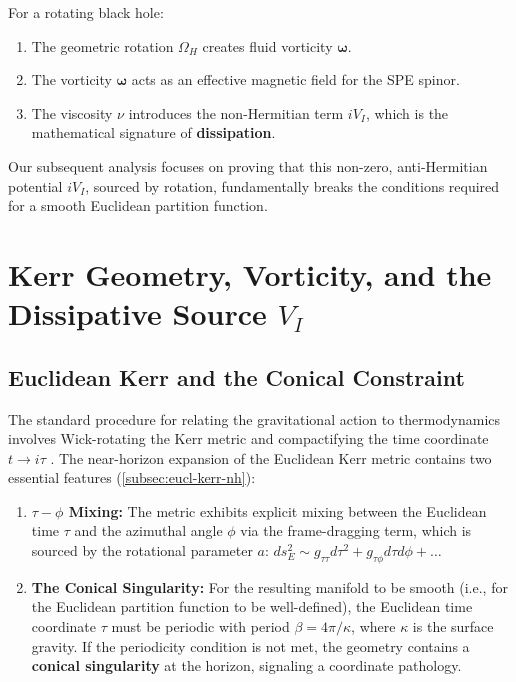 \documentclass[11pt]{article}
\begin{document}
For a rotating black hole:
\begin{enumerate}
    \item The geometric rotation $\Omega_H$ creates fluid vorticity $\mathbf{\omega}$.
    \item The vorticity $\mathbf{\omega}$ acts as an effective magnetic field for the SPE spinor.
    \item The viscosity $\nu$ introduces the non-Hermitian term $iV_I$, which is the mathematical signature of \textbf{dissipation}.
\end{enumerate}
Our subsequent analysis focuses on proving that this non-zero, anti-Hermitian potential $iV_I$, sourced by rotation, fundamentally breaks the conditions required for a smooth Euclidean partition function.

\section{Kerr Geometry, Vorticity, and the Dissipative Source $V_I$}

\subsection{Euclidean Kerr and the Conical Constraint}

The standard procedure for relating the gravitational action to thermodynamics involves Wick-rotating the Kerr metric\cite{Kerr1963} and compactifying the time coordinate $t \to i\tau$ \cite{GibbonsHawking1977}. The near-horizon expansion of the Euclidean Kerr metric\cite{Kerr1963} contains two essential features (\autoref{subsec:eucl-kerr-nh}):

\begin{enumerate}
    \item \textbf{$\tau-\phi$ Mixing:} The metric exhibits explicit mixing between the Euclidean time $\tau$ and the azimuthal angle $\phi$ via the frame-dragging term, which is sourced by the rotational parameter $a$: $ds^2_E \sim g_{\tau\tau} d\tau^2 + g_{\tau\phi} d\tau d\phi + \dots$
    \item \textbf{The Conical Singularity:} For the resulting manifold to be smooth (i.e., for the Euclidean partition function to be well-defined), the Euclidean time coordinate $\tau$ must be periodic with period $\beta = 4\pi/\kappa$, where $\kappa$ is the surface gravity. If the periodicity condition is not met, the geometry contains a \textbf{conical singularity} at the horizon, signaling a coordinate pathology.
\end{enumerate}
\end{document}
